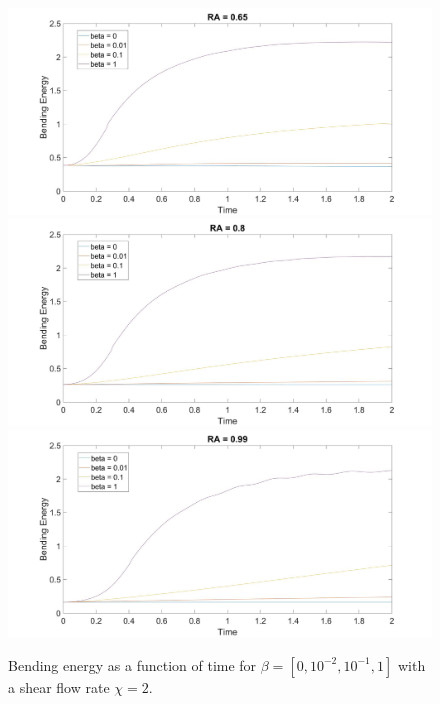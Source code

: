 \documentclass[aps,prl,showpacs]{revtex4}
\begin{document}
 \begin{figure}
 	\centering
 	\includegraphics[width=.9\textwidth]{figures/BE10.jpg}
 	\includegraphics[width=.9\textwidth]{figures/BE11.jpg}
 	\includegraphics[width=.9\textwidth]{figures/BE12.jpg}
 	\caption{Bending energy as a function of time for $\beta = [0, 10^{-2},10^{-1}, 1]$ with a shear flow rate $\chi = 2$.}
 	\label{Shear0}
 \end{figure}
\end{document}

